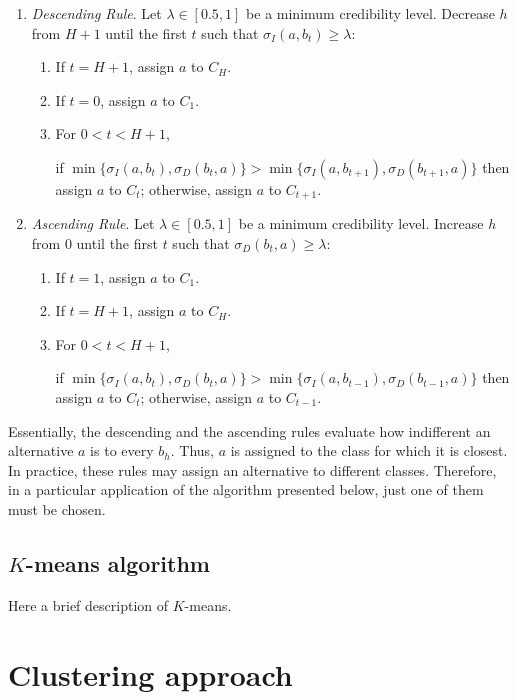 \documentclass[]{elsarticle}
\theoremstyle{definition}
\begin{document}
\begin{enumerate}
\item
\emph{Descending Rule}. Let $\lambda \in [0.5,1]$ be a minimum credibility level. Decrease $h$ from $H+1$ until the first $t$ such that $\sigma_I(a,b_t)\geq \lambda$:

\begin{enumerate}
\item
If $t=H+1$, assign $a$ to $C_H$.
\item
If $t=0$, assign $a$ to $C_1$.
\item
For $0<t<H+1$, 

if $\min\{\sigma_I(a,b_t),\sigma_D(b_t,a)\} > \min\{\sigma_I(a,b_{t+1}),\sigma_D(b_{t+1},a)\}$ then assign $a$ to $C_t$; otherwise, assign $a$ to $C_{t+1}$.
\end{enumerate} 

\item
\emph{Ascending Rule}. Let $\lambda \in [0.5,1]$ be a minimum credibility level. Increase $h$ from $0$ until the first $t$ such that $\sigma_D(b_t,a)\geq \lambda$:

\begin{enumerate}
\item
If $t=1$, assign $a$ to $C_1$.
\item
If $t=H+1$, assign $a$ to $C_H$.
\item
For $0<t<H+1$, 

if $\min\{\sigma_I(a,b_t),\sigma_D(b_t,a)\} > \min\{\sigma_I(a,b_{t-1}),\sigma_D(b_{t-1},a)\}$ then assign $a$ to $C_t$; otherwise, assign $a$ to $C_{t-1}$.
\end{enumerate} 
\end{enumerate}


Essentially, the descending and the ascending rules evaluate how indifferent an alternative $a$ is to every $b_h$.  Thus, $a$ is assigned to the class for which it is closest.  In practice, these rules may assign an alternative to different classes. Therefore, in a particular application of the algorithm presented below, just one of them must be chosen.


\subsection{$K$-means algorithm}

Here a brief description of $K$-means.


\section{Clustering approach}\label{methodology}
\end{document}
